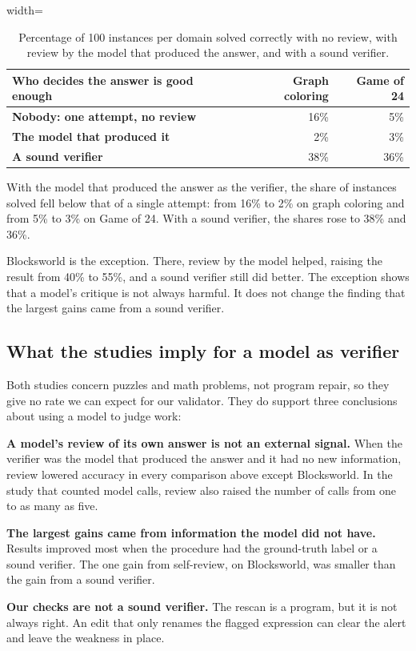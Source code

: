 \begin{table}[htbp]
  \caption{Percentage of 100 instances per domain solved correctly with no review, with review by the
  model that produced the answer, and with a sound verifier.}
  \label{tab:planning-verifier}
  \begin{adjustbox}{width=\linewidth}\begin{tabularx}{\linewidth}{Xrr}
    \toprule
    \textbf{Who decides the answer is good enough} & \textbf{Graph coloring} & \textbf{Game of 24} \\
    \midrule
    \textbf{Nobody: one attempt, no review} & 16\% & 5\% \\ \addlinespace
    \textbf{The model that produced it} & 2\% & 3\% \\ \addlinespace
    \textbf{A sound verifier} & 38\% & 36\% \\
    \bottomrule
  \end{tabularx}\end{adjustbox}
\end{table}

With the model that produced the answer as the verifier, the share of instances solved fell below
that of a single attempt: from 16\% to 2\% on graph coloring and from 5\% to 3\% on Game of 24. With
a sound verifier, the shares rose to 38\% and 36\%.

Blocksworld is the exception. There, review by the model helped, raising the result from 40\% to
55\%, and a sound verifier still did better. The exception shows that a model's critique is not
always harmful. It does not change the finding that the largest gains came from a sound verifier.

\subsection{What the studies imply for a model as verifier}
\label{sec:planning-judge}

Both studies concern puzzles and math problems, not program repair, so they give no rate we can
expect for our validator. They do support three conclusions about using a model to judge work:
\bi
\item \textbf{A model's review of its own answer is not an external signal.} When the verifier was
the model that produced the answer and it had no new information, review lowered accuracy in every
comparison above except Blocksworld. In the study that counted model calls, review also raised the
number of calls from one to as many as five.
\item \textbf{The largest gains came from information the model did not have.} Results improved most
when the procedure had the ground-truth label or a sound verifier. The one gain from self-review, on
Blocksworld, was smaller than the gain from a sound verifier.
\item \textbf{Our checks are not a sound verifier.} The rescan is a program, but it is not always
right. An edit that only renames the flagged expression can clear the alert and leave the weakness
in place.
\ei

